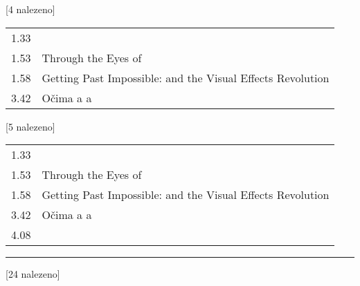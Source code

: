 \begin{table}[ht!]
\begin{tt}
\noindent
\begin{minipage}[t]{.5\textwidth}\vspace{0pt}
 [4 nalezeno]\vspace{5pt}

\begin{tabulary}{1.1\textwidth}{LL}
1.33 &   \\
1.53 & Through the Eyes of   \\
1.58 & Getting Past Impossible:   and the Visual Effects Revolution \\
3.42 & Očima a a \\
\end{tabulary}
\end{minipage}
\begin{minipage}[t]{.5\textwidth}\vspace{0pt}
 [5 nalezeno]\vspace{5pt}

\begin{tabulary}{1.1\textwidth}{LL}
1.33 &   \\
1.53 & Through the Eyes of   \\
1.58 & Getting Past Impossible:   and the Visual Effects Revolution \\
3.42 & Očima a a \\
4.08 &   \\
\end{tabulary}
\end{minipage}

\mbox{}\vspace{5pt}
\hrule
\mbox{}

\noindent
\begin{minipage}[t]{.5\textwidth}\vspace{0pt}
 [24 nalezeno]\vspace{5pt}


\end{minipage}
\end{tt}
\end{table}
